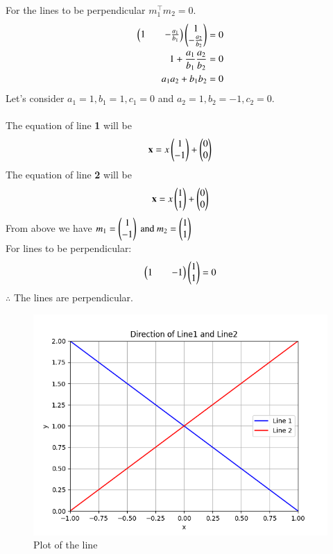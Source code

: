 \documentclass[journal]{IEEEtran}
\begin{document}
For the lines to be perpendicular $m_1^\top m_2 = 0.$\label{eq1.5.37.1}
\begin{align}
    \begin{pmatrix}1 && -\frac{a_1}{b_1}\end{pmatrix}\begin{pmatrix}1 \\ -\frac{a_2}{b_2}\end{pmatrix} = 0\\
    1 + \frac{a_1}{b_1}\frac{a_2}{b_2} = 0\\
    a_1a_2 + b_1b_2 = 0
\end{align}
Let's consider $a_1 = 1, b_1 = 1, c_1 = 0$ and 
$a_2 = 1, b_2 = -1, c_2 =0. $\\ \\
The equation of line \textbf{1} will be
\begin{align}
\mathbf{x} = x\begin{pmatrix}1 \\ -1\end{pmatrix} + \begin{pmatrix}0 \\ 0\end{pmatrix}
\end{align}
The equation of line \textbf{2} will be
\begin{align}
\mathbf{x} = x\begin{pmatrix}1 \\ 1\end{pmatrix} + \begin{pmatrix}0 \\ 0\end{pmatrix}
\end{align}
From above we have $m_1 = \begin{pmatrix}1 \\-1 \end{pmatrix} \text{ and } m_2 = \begin{pmatrix}1 \\ 1\end{pmatrix} $ \\
For lines to be perpendicular:
\begin{align}
    \begin{pmatrix}1 && -1\end{pmatrix}\begin{pmatrix}1\\ 1\end{pmatrix} = 0    
\end{align}
 $\therefore$ The lines are perpendicular.

 \begin{figure}[h!]
   \centering
   \includegraphics[width=0.7\linewidth]{figs/fig.png}
   \caption{Plot of the line}
   \label{stemplot}
\end{figure}
\end{document}
